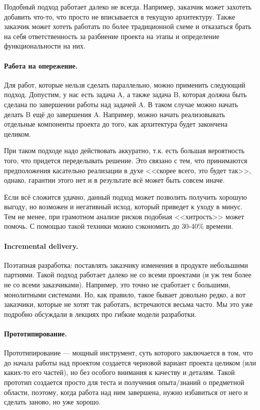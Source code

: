 \documentclass{../../text-style}
\begin{document}
Подобный подход работает далеко не всегда. Например, заказчик может захотеть добавить что-то, что просто не вписывается в текущую архитектуру. Также заказчик может хотеть работать по более традиционной схеме и отказаться брать на себя ответственность за разбиение проекта на этапы и определение функциональности на них.

\paragraph{Работа на опережение.} Для работ, которые нельзя сделать параллельно, можно применить следующий подход. Допустим, у нас есть задача A, а также задача B, которая должна быть сделана по завершении работы над задачей A. В таком случае можно начать делать B ещё до завершения A. Например, можно начать реализовывать отдельные компоненты проекта до того, как архитектура будет закончена целиком.

При таком подходе надо действовать аккуратно, т.к. есть большая вероятность того, что придется переделывать решение. Это связано с тем, что принимаются предположения касательно реализации в духе <<скорее всего, это будет так>>, однако, гарантии этого нет и в результате всё может быть совсем иначе.

Если всё сложится удачно, данный подход может позволить получить хорошую выгоду, но возможен и негативный исход, который приведет к уходу в минус. Тем не менее, при грамотном анализе рисков подобная <<хитрость>> может помочь. С помощью такой техники можно сэкономить до 30-40\% времени.

\paragraph{Incremental delivery.} Поэтапная разработка: поставлять заказчику изменения в продукте небольшими партиями. Такой подход работает далеко не со всеми проектами (и уж тем более не со всеми заказчиками). Например, это точно не сработает с большими, монолитными системами. Но, как правило, такое бывает довольно редко, а вот заказчики, которые не хотят так работать, встречаются весьма часто. Мы это уже подробно обсуждали в лекциях про гибкие модели разработки.

\paragraph{Прототипирование.} Прототипирование --- мощный инструмент, суть которого заключается в том, что до начала работы над проектом создается черновой вариант проекта целиком (или каких-то его частей), но без особого внимания к качеству и деталям. Такой прототип создается просто для теста и получения опыта/знаний о предметной области, поэтому, когда работа над ним завершена, нужно избавиться от него и сделать заново, но уже хорошо.
\end{document}
